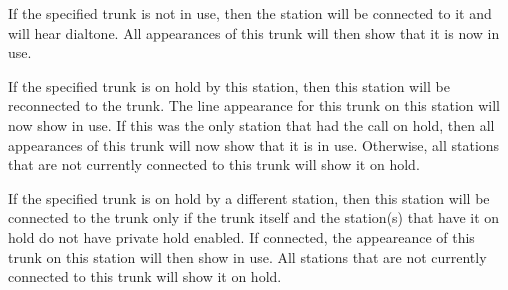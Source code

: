 \documentclass[12pt,a4]{article}
\begin{document}
If the specified trunk is not in use, then the station will be connected to it and
will hear dialtone.  All appearances of this trunk will then show that it
is now in use.

If the specified trunk is on hold by this station, then this station will be
reconnected to the trunk.  The line appearance for this trunk on this station
will now show in use.  If this was the only station that had the call on hold,
then all appearances of this trunk will now show that it is in use.  Otherwise,
all stations that are not currently connected to this trunk will show it
on hold.

If the specified trunk is on hold by a different station, then this station
will be connected to the trunk only if the trunk itself and the station(s) that
have it on hold do not have private hold enabled.  If connected, the appeareance
of this trunk on this station will then show in use.  All stations that are not
currently connected to this trunk will show it on hold.
\end{document}
